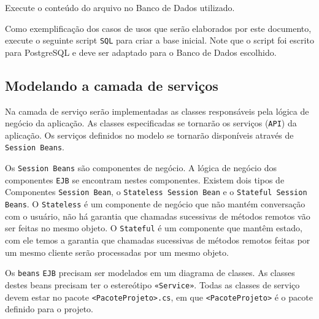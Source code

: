 Execute o conteúdo do arquivo no Banco de Dados utilizado.

Como exemplificação dos casos de usos que serão elaborados por este documento,
execute o seguinte script \texttt{SQL} para criar a base inicial. Note que o
script foi escrito para PostgreSQL e deve ser adaptado para o Banco de Dados
escolhido.

\begin{framed}
	
\end{framed}

\subsection{Modelando a camada de serviços}

Na camada de serviço serão implementadas as classes responsáveis pela lógica de
negócio da aplicação. As classes especificadas se tornarão os serviços
(\texttt{API}) da aplicação. Os serviços definidos no modelo se tornarão
disponíveis através de \texttt{Session Beans}.

Os \texttt{Session Beans} são componentes de negócio. A lógica de negócio dos
componentes \texttt{EJB} se encontram nestes componentes. Existem dois tipos de
Componentes \texttt{Session Bean}, o \texttt{Stateless Session Bean} e o
\texttt{Stateful Session Beans}. O \texttt{Stateless} é um componente de negócio
que não mantém conversação com o usuário, não há garantia que chamadas
sucessivas de métodos remotos vão ser feitas no mesmo objeto. O
\texttt{Stateful} é um componente que mantêm estado, com ele temos a garantia
que chamadas sucessivas de métodos remotos feitas por um mesmo cliente serão
processadas por um mesmo objeto.

Os \texttt{beans} \texttt{EJB} precisam ser modelados em um diagrama de classes.
As classes destes beans precisam ter o estereótipo \texttt{«Service»}. Todas as
classes de serviço devem estar no pacote \texttt{<PacoteProjeto>.cs}, em que
\texttt{<PacoteProjeto>} é o pacote definido para o projeto.

